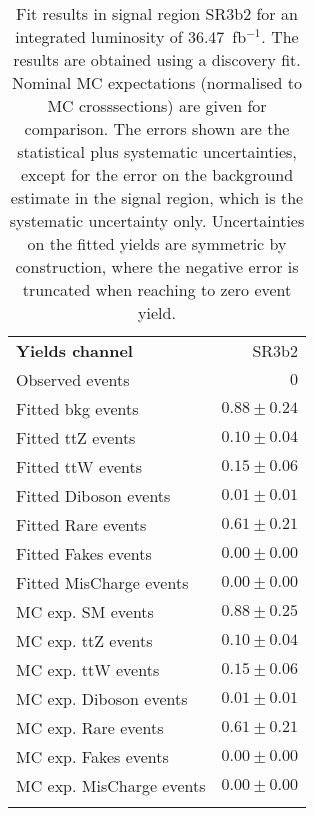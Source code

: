 

\begin{table}
\begin{center}
\setlength{\tabcolsep}{0.0pc}
{\small
\begin{tabular*}{\textwidth}{@{\extracolsep{\fill}}lr}
\noalign{\smallskip}\hline\noalign{\smallskip}
{\bfseries Yields channel}           & SR3b2              \\[-0.05cm]
\noalign{\smallskip}\hline\noalign{\smallskip}
Observed events          & $0$                    \\
\noalign{\smallskip}\hline\noalign{\smallskip}
Fitted bkg events         & $0.88 \pm 0.24$              \\
\noalign{\smallskip}\hline\noalign{\smallskip}
        Fitted ttZ events         & $0.10 \pm 0.04$              \\
        Fitted ttW events         & $0.15 \pm 0.06$              \\
        Fitted Diboson events         & $0.01 \pm 0.01$              \\
        Fitted Rare events         & $0.61 \pm 0.21$              \\
        Fitted Fakes events         & $0.00 \pm 0.00$              \\
        Fitted MisCharge events         & $0.00 \pm 0.00$              \\
 \noalign{\smallskip}\hline\noalign{\smallskip}
MC exp. SM events              & $0.88 \pm 0.25$              \\
\noalign{\smallskip}\hline\noalign{\smallskip}
        MC exp. ttZ events         & $0.10 \pm 0.04$              \\
        MC exp. ttW events         & $0.15 \pm 0.06$              \\
        MC exp. Diboson events         & $0.01 \pm 0.01$              \\
        MC exp. Rare events         & $0.61 \pm 0.21$              \\
        MC exp. Fakes events         & $0.00 \pm 0.00$              \\
        MC exp. MisCharge events         & $0.00 \pm 0.00$              \\
\noalign{\smallskip}\hline\noalign{\smallskip}
\end{tabular*}
}
\end{center}
\caption{Fit results in signal region SR3b2 for an integrated luminosity of 36.47~fb$^{-1}$.
The results are obtained using a discovery fit. Nominal MC expectations (normalised to MC crosssections) are given for comparison. 
The errors shown are the statistical plus systematic uncertainties, except for the error on the background estimate in the signal region, which is the systematic uncertainty only.
Uncertainties on the fitted yields are symmetric by construction, where the negative error is truncated when reaching to zero event yield.
}
\label{table.results.systematics.in.logL.fit..Yields.SR3b2}
\end{table}
\clearpage
%